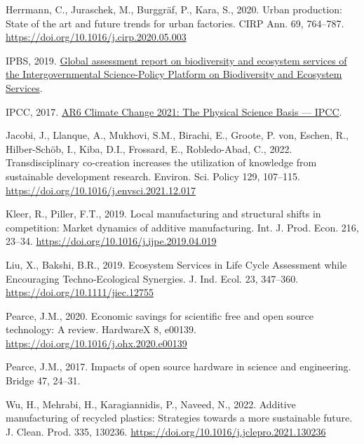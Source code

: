 \documentclass[
  11pt,
]{article}
\newlength{\cslhangindent}
\newlength{\cslentryspacingunit} %
\newenvironment{CSLReferences}[2] %
 {%
  \setlength{\parindent}{0pt}
  \ifodd #1
  \let\oldpar\par
  \def\par{\hangindent=\cslhangindent\oldpar}
  \fi
  \setlength{\parskip}{#2\cslentryspacingunit}
 }%
 {}
\begin{document}
\begin{CSLReferences}{1}{0}
\leavevmode{}%
Herrmann, C., Juraschek, M., Burggräf, P., Kara, S., 2020. {Urban
production: State of the art and future trends for urban factories}.
CIRP Ann. 69, 764--787. \url{https://doi.org/10.1016/j.cirp.2020.05.003}

\leavevmode{}%
IPBS, 2019.
\href{https://ipbes.net/global-assessment\%7B/\%\%7D0Ahttps://ipbes.net/global-assessment-report-biodiversity-ecosystem-services}{{Global
assessment report on biodiversity and ecosystem services of the
Intergovernmental Science-Policy Platform on Biodiversity and Ecosystem
Services}}.

\leavevmode{}%
IPCC, 2017.
\href{https://www.ipcc.ch/report/sixth-assessment-report-working-group-i/}{{AR6
Climate Change 2021: The Physical Science Basis --- IPCC}}.

\leavevmode{}%
Jacobi, J., Llanque, A., Mukhovi, S.M., Birachi, E., Groote, P. von,
Eschen, R., Hilber-Schöb, I., Kiba, D.I., Frossard, E., Robledo-Abad,
C., 2022. {Transdisciplinary co-creation increases the utilization of
knowledge from sustainable development research}. Environ. Sci. Policy
129, 107--115. \url{https://doi.org/10.1016/j.envsci.2021.12.017}

\leavevmode{}%
Kleer, R., Piller, F.T., 2019. {Local manufacturing and structural
shifts in competition: Market dynamics of additive manufacturing}. Int.
J. Prod. Econ. 216, 23--34.
\url{https://doi.org/10.1016/j.ijpe.2019.04.019}

\leavevmode{}%
Liu, X., Bakshi, B.R., 2019. {Ecosystem Services in Life Cycle
Assessment while Encouraging Techno‐Ecological Synergies}. J. Ind. Ecol.
23, 347--360. \url{https://doi.org/10.1111/jiec.12755}

\leavevmode{}%
Pearce, J.M., 2020. {Economic savings for scientific free and open
source technology: A review}. HardwareX 8, e00139.
\url{https://doi.org/10.1016/j.ohx.2020.e00139}

\leavevmode{}%
Pearce, J.M., 2017. {Impacts of open source hardware in science and
engineering}. Bridge 47, 24--31.

\leavevmode{}%
Wu, H., Mehrabi, H., Karagiannidis, P., Naveed, N., 2022. {Additive
manufacturing of recycled plastics: Strategies towards a more
sustainable future}. J. Clean. Prod. 335, 130236.
\url{https://doi.org/10.1016/j.jclepro.2021.130236}

\end{CSLReferences}
\end{document}
